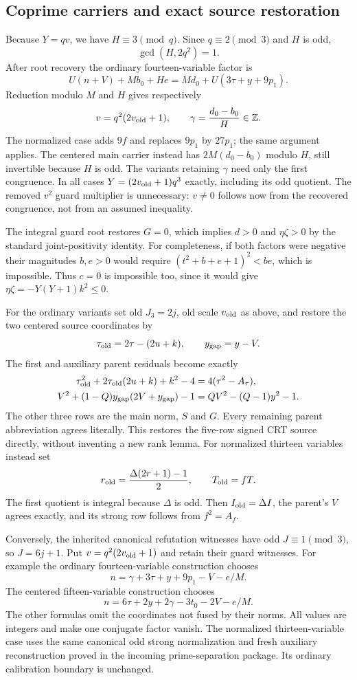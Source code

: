 \subsection{Coprime carriers and exact source restoration}
Because $Y=qv$, we have $H\equiv3\pmod q$. Since $q\equiv2\pmod3$
and $H$ is odd,
\[
 \gcd(H,2q^2)=1.
\]
After root recovery the ordinary fourteen-variable factor is
\[
 U(n+V)+Mb_0+He=Md_0+U(3\tau+y+9p_1).
\]
Reduction modulo $M$ and $H$ gives respectively
\[
 v=q^2(2v_{\rm old}+1),\qquad
 \gamma=\frac{d_0-b_0}{H}\in\mathbb Z.
\]
The normalized case adds $9f$ and replaces $9p_1$ by $27p_1$;
the same argument applies. The centered main carrier instead has
$2M(d_0-b_0)$ modulo $H$, still invertible because $H$ is odd.
The variants retaining $\gamma$ need only the first congruence.
In all cases $Y=(2v_{\rm old}+1)q^3$ exactly, including its odd quotient.
The removed $v^2$ guard multiplier is unnecessary: $v\ne0$ follows
now from the recovered congruence, not from an assumed inequality.

The integral guard root restores $G=0$, which implies $d>0$ and
$\eta\zeta>0$ by the standard joint-positivity identity. For completeness,
if both factors were negative their magnitudes $b,e>0$ would require
$(t^2+b+e+1)^2<be$, which is impossible. Thus $c=0$ is impossible too,
since it would give $\eta\zeta=-Y(Y+1)k^2\le0$.

For the ordinary variants set old $J_3=2j$, old scale $v_{\rm old}$
as above, and restore the two centered source coordinates by
\[
 \tau_{\rm old}=2\tau-(2u+k),\qquad y_{\rm gap}=y-V.
\]
The first and auxiliary parent residuals become exactly
\begin{align*}
 \tau_{\rm old}^2+2\tau_{\rm old}(2u+k)+k^2-4
   &=4(\tau^2-A_\tau),\\
 V^2+(1-Q)y_{\rm gap}(2V+y_{\rm gap})-1
   &=QV^2-(Q-1)y^2-1.
\end{align*}
The other three rows are the main norm, $S$ and $G$.
Every remaining parent abbreviation agrees literally. This restores the
five-row signed CRT source directly, without inventing a new rank lemma.
For normalized thirteen variables instead set
\[
 r_{\rm old}=\frac{\Delta(2r+1)-1}{2},\qquad
 T_{\rm old}=fT.
\]
The first quotient is integral because $\Delta$ is odd. Then
$I_{\rm old}=\Delta I$, the parent's $V$ agrees exactly, and its strong
row follows from $f^2=A_f$.

Conversely, the inherited canonical refutation witnesses have odd
$J\equiv1\pmod3$, so $J=6j+1$. Put
$v=q^2(2v_{\rm old}+1)$ and retain their guard witnesses.
For example the ordinary fourteen-variable construction chooses
\[
 n=\gamma+3\tau+y+9p_1-V-e/M.
\]
The centered fifteen-variable construction chooses
\[
 n=6\tau+2y+2\gamma-3t_0-2V-e/M.
\]
The other formulas omit the coordinates not fused by their norms.
All values are integers and make one conjugate factor vanish.
The normalized thirteen-variable case uses the same canonical odd strong
normalization and fresh auxiliary reconstruction proved in the incoming
prime-separation package. Its ordinary calibration boundary is unchanged.

